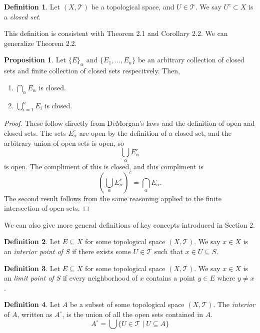 \documentclass{article}
\newcommand{\T}{\mathcal{T}}
\theoremstyle{definition}
\newtheorem{proposition}{Proposition}[section]
\newtheorem{definition}{Definition}[section]
\begin{document}
		\begin{definition}\label{def13.4}
		Let $(X,\T)$ be a topological space, and $U\in \mathcal T$. We say $U^c\subset X$ is a \textit{\color{red}closed set}.
	\end{definition}
	This definition is consistent with Theorem 2.1 and Corollary 2.2. We can generalize Theorem 2.2.
	\begin{proposition}
		Let $\{E\}_\alpha$ and $\{E_1,\ldots,E_n\}$ be an arbitrary collection of closed sets and finite collection of closed sets respecitvely. Then,
		\begin{enumerate}
			\item $\bigcap_\alpha E_\alpha$ is closed.
			\item $\bigcup_{i=1}^n E_i$ is closed.
		\end{enumerate}
	\end{proposition}
	\begin{proof}
		These follow directly from DeMorgan's laws and the definition of open and closed sets. The sets $E_\alpha^c$ are open by the definition of a closed set, and the arbitrary union of open sets is open, so
		$$ \bigcup_\alpha E_\alpha^c $$ is open. The compliment of this is closed, and this compliment is 
		$$ \left(\bigcup_\alpha E_\alpha^c\right)^c =  \bigcap_\alpha E_\alpha.$$
		The second result follows from the same reasoning applied to the finite intersection of open sets.
	\end{proof}
	
	We can also give more general definitions of key concepts introduced in Section 2.
	
	
	\begin{definition}
		Let $E\subseteq X$ for some topological space $(X,\T)$. We say $x\in X$ is an \textit{\color{red}interior point of $S$} if there exists some $U\in \T$ such that $x\in U\subseteq S$. 
	\end{definition}
		\begin{definition}
		Let $E\subseteq X$ for some topological space $(X,\T)$. We say $x\in X$ is an \textit{\color{red}limit point of $S$} if every neighborhood of $x$ contains a point $y\in E$ where $y\neq x$.
	\end{definition}
	
	\begin{definition}\label{def13.5}
		Let $A$ be a subset of some topological space $(X,\T)$. The  \textit{\color{red}interior} of $A$, written as  $A^\circ$, is the union of all the open sets contained in $A$.
		$$A^\circ = \bigcup\{U\in\mathcal T\mid U\subseteq A\}$$
	\end{definition}
	
\end{document}
